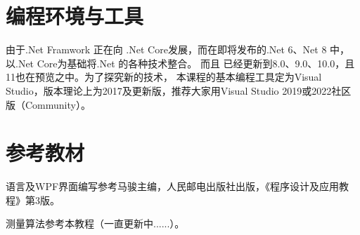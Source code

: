 \section*{编程环境与工具}

由于.Net Framwork 正在向 .Net Core发展，而在即将发布的.Net 6、Net 8 中，以.Net Core为基础将.Net 的各种技术整合。
而且 \cs 已经更新到8.0、9.0、10.0，且11也在预览之中。为了探究新的技术，
本课程的基本编程工具定为Visual Studio，版本理论上为2017及更新版，推荐大家用Visual Studio 2019或2022社区版（Community）。

\section*{参考教材}

\cs 语言及WPF界面编写参考马骏主编，人民邮电出版社出版，《\cs 程序设计及应用教程》第3版。

测量算法参考本教程（一直更新中......）。
